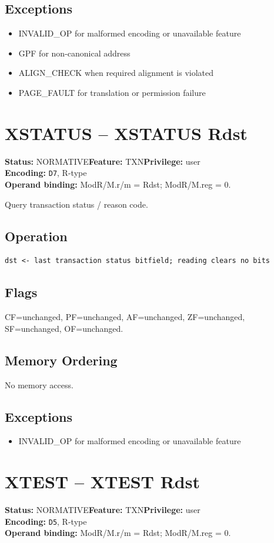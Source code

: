 \documentclass[10pt]{article}
\begin{document}
\subsection*{Exceptions}
\begin{itemize}
\item INVALID\_OP for malformed encoding or unavailable feature
\item GPF for non-canonical address
\item ALIGN\_CHECK when required alignment is violated
\item PAGE\_FAULT for translation or permission failure
\end{itemize}
\clearpage

\section{XSTATUS -- XSTATUS Rdst}
\textbf{Status:} NORMATIVE\quad \textbf{Feature:} TXN\quad \textbf{Privilege:} user\\
\textbf{Encoding:} \texttt{D7}, R-type\\
\textbf{Operand binding:} ModR/M.r/m = Rdst; ModR/M.reg = 0.

Query transaction status / reason code.

\subsection*{Operation}
\begin{lstlisting}
dst <- last transaction status bitfield; reading clears no bits
\end{lstlisting}
\subsection*{Flags}
CF=unchanged, PF=unchanged, AF=unchanged, ZF=unchanged, SF=unchanged, OF=unchanged.
\subsection*{Memory Ordering}
No memory access.
\subsection*{Exceptions}
\begin{itemize}
\item INVALID\_OP for malformed encoding or unavailable feature
\end{itemize}
\clearpage

\section{XTEST -- XTEST Rdst}
\textbf{Status:} NORMATIVE\quad \textbf{Feature:} TXN\quad \textbf{Privilege:} user\\
\textbf{Encoding:} \texttt{D5}, R-type\\
\textbf{Operand binding:} ModR/M.r/m = Rdst; ModR/M.reg = 0.
\end{document}

